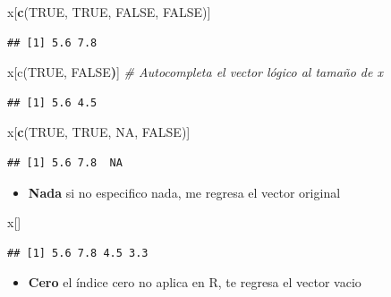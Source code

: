 \documentclass[]{article}
\newenvironment{Shaded}{\begin{snugshade}}{\end{snugshade}}
\newcommand{\KeywordTok}[1]{\textcolor[rgb]{0.13,0.29,0.53}{\textbf{{#1}}}}
\newcommand{\CommentTok}[1]{\textcolor[rgb]{0.56,0.35,0.01}{\textit{{#1}}}}
\newcommand{\OtherTok}[1]{\textcolor[rgb]{0.56,0.35,0.01}{{#1}}}
\newcommand{\ErrorTok}[1]{\textbf{{#1}}}
\newcommand{\NormalTok}[1]{{#1}}
\begin{document}
\begin{Shaded}
\begin{Highlighting}[]
\NormalTok{x[}\KeywordTok{c}\NormalTok{(}\OtherTok{TRUE}\NormalTok{, }\OtherTok{TRUE}\NormalTok{, }\OtherTok{FALSE}\NormalTok{, }\OtherTok{FALSE}\NormalTok{)]}
\end{Highlighting}
\end{Shaded}

\begin{verbatim}
## [1] 5.6 7.8
\end{verbatim}

\begin{Shaded}
\begin{Highlighting}[]
\NormalTok{x[c(}\OtherTok{TRUE}\NormalTok{, }\OtherTok{FALSE}\ErrorTok{)}\NormalTok{] }\CommentTok{# Autocompleta el vector lógico al tamaño de x}
\end{Highlighting}
\end{Shaded}

\begin{verbatim}
## [1] 5.6 4.5
\end{verbatim}

\begin{Shaded}
\begin{Highlighting}[]
\NormalTok{x[}\KeywordTok{c}\NormalTok{(}\OtherTok{TRUE}\NormalTok{, }\OtherTok{TRUE}\NormalTok{, }\OtherTok{NA}\NormalTok{, }\OtherTok{FALSE}\NormalTok{)]}
\end{Highlighting}
\end{Shaded}

\begin{verbatim}
## [1] 5.6 7.8  NA
\end{verbatim}

\begin{itemize}
\itemsep1pt\parskip0pt
\item
  \textbf{Nada} si no especifico nada, me regresa el vector original
\end{itemize}

\begin{Shaded}
\begin{Highlighting}[]
\NormalTok{x[]}
\end{Highlighting}
\end{Shaded}

\begin{verbatim}
## [1] 5.6 7.8 4.5 3.3
\end{verbatim}

\begin{itemize}
\itemsep1pt\parskip0pt
\item
  \textbf{Cero} el índice cero no aplica en R, te regresa el vector
  vacio
\end{itemize}
\end{document}
